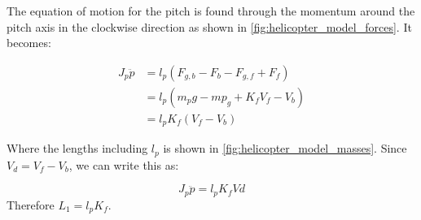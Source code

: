 The equation of motion for the pitch is found through the momentum
around the pitch axis in the clockwise direction as shown in
\cref{fig:helicopter_model_forces}. It becomes:

\begin{align*}
  J_p\ddot{p} &= l_p(F_{g,b} - F_b - F_{g,f} + F_f) \\
              &= l_p(m_pg - mp_g + K_fV_f - V_b) \\
              &= l_pK_f(V_f-V_b)
\end{align*}

Where the lengths including $l_p$ is shown in
\cref{fig:helicopter_model_masses}. Since $V_d = V_f-V_b$, we can
write this as:

\begin{equation}
  \label{eq:pitch EoM}
  J_p\ddot{p} = l_pK_fVd
\end{equation}
Therefore $L_1 = l_pK_f$.

